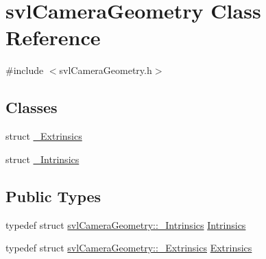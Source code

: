 \hypertarget{classsvl_camera_geometry}{}\section{svl\+Camera\+Geometry Class Reference}
\label{classsvl_camera_geometry}


{\ttfamily \#include $<$svl\+Camera\+Geometry.\+h$>$}

\subsection*{Classes}
\begin{DoxyCompactItemize}
\item 
struct \hyperlink{structsvl_camera_geometry_1_1___extrinsics}{\+\_\+\+Extrinsics}
\item 
struct \hyperlink{structsvl_camera_geometry_1_1___intrinsics}{\+\_\+\+Intrinsics}
\end{DoxyCompactItemize}
\subsection*{Public Types}
\begin{DoxyCompactItemize}
\item 
typedef struct \hyperlink{structsvl_camera_geometry_1_1___intrinsics}{svl\+Camera\+Geometry\+::\+\_\+\+Intrinsics} \hyperlink{classsvl_camera_geometry_a864f6359614466009baca0666e6bc08e}{Intrinsics}
\item 
typedef struct \hyperlink{structsvl_camera_geometry_1_1___extrinsics}{svl\+Camera\+Geometry\+::\+\_\+\+Extrinsics} \hyperlink{classsvl_camera_geometry_a6954baa4bd0cc3577af09e13b1c18545}{Extrinsics}
\end{DoxyCompactItemize}
